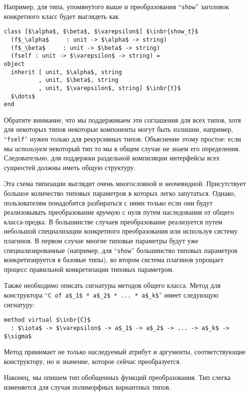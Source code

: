 \noindent Например, для типа, упомянутого выше и преобразования ``\lstinline{show}'' заголовок конкретного класс будет выглядеть как

\begin{lstlisting}
class [$\alpha$, $\beta$, $\varepsilon$] $\inbr{show_t}$ 
  (f$_\alpha$     : unit -> $\alpha$ -> string)
  (f$_\beta$     : unit -> $\beta$ -> string)
  (fself : unit -> $\varepsilon$ -> string) =
object 
  inherit [ unit, $\alpha$, string
          , unit, $\beta$, string
          , unit, $\varepsilon$, string] $\inbr{t}$
  $\dots$
end 
\end{lstlisting}

Обратите внимание, что мы поддерживаем эти соглашения для всех типов, хотя для некоторых типов некоторые компоненты могут быть излишни, например, ``\lstinline{fself}''
нужен только для рекурсивных типов. Объяснение этому простое: если мы \emph{используем} некоторый тип
то мы в общем случае не знаем его определения. Следовательно, для поддержки раздельной компиляции интерфейсы всех сущностей должны иметь общую структуру.

Эта схема типизации выглядит очень многословной и неочевидной. Присутствует большое количество типовых параметров в которых легко запутаться.
Однако, пользователям понадобится разбираться с ними только если они будут реализовывать преобразование \emph{вручную} с нуля путем 
наследования от общего класса-предка.
В большинстве случаев преобразование реализуется путем небольшой специализации конкретного преобразования или используя систему плагинов. 
В первом случае многие типовые параметры будут уже специализированные (например, для  ``\lstinline{show}'' большинство типовых параметров конкретизируется в базовые типы), во втором система плагинов упрощает процесс правильной конкретизации типовых параметром. %

Также необходимо описать сигнатуры методов общего класса. Метод для конструктора  ``\lstinline|C of a$_1$ * a$_2$ * ... * a$_k$|'' имеет следующую сигнатуру:

\begin{lstlisting}
method virtual $\inbr{C}$ 
  : $\iota$ -> $\varepsilon$ -> a$_1$ -> a$_2$ -> ... -> a$_k$ -> $\sigma$
\end{lstlisting}

\noindent Метод принимает не только наследуемый атрибут и аргументы, соответствующие конструктору, но и значение, которое сейчас преобразуется.

Наконец, мы опишем тип обобщенных функций преобразования. Тип слегка изменяется для случая полиморфных вариантных типов.


